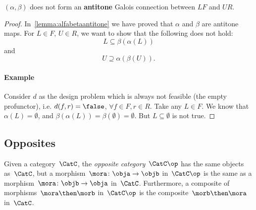 

\begin{lemma} $(\alpha, \beta)$ does not form an \textbf{antitone} Galois connection between $LF$ and $UR$.
\end{lemma}
\begin{proof}
In~\cref{lemma:alfabetaantitone} we have proved that $\alpha$ and $\beta$ are antitone maps. For $L\in F$, $U\in R$, we want to show that the following does not hold:
\begin{equation}
\label{eq:alfabetafirst}
    L\subseteq \beta(\alpha(L))
\end{equation}
and
\begin{equation}
\label{eq:alfabetasec}
     U\supseteq \alpha(\beta(U)).
\end{equation}
\paragraph{Example} Consider $d$ as the design problem which is always not feasible (the empty profunctor), i.e. $d(f,r)=\false$, $\forall f\in F,r\in R$. Take any $L\in F$. We know that $\alpha(L)=\emptyset$, and $\beta(\alpha(L))=\beta(\emptyset)=\emptyset$. But $L\subseteq \emptyset$ is not true.

\end{proof}


\subsection{Opposites}

\begin{ctdefinition}
\label{def:oppositecat}
Given a category~$\CatC$, the \emph{opposite category}~$\CatC\op$ has the same objects as~$\CatC$, but a morphism~$\mora\colon \obja\to \objb$ in~$\CatC\op$ is the same as a morphism~$\mora\colon \objb\to \obja$ in~$\CatC$. Furthermore, a composite of morphisms~$\mora \then \morb$ in~$\CatC\op$ is the composite~$\morb\then \mora$ in~$\CatC$.
\end{ctdefinition}

